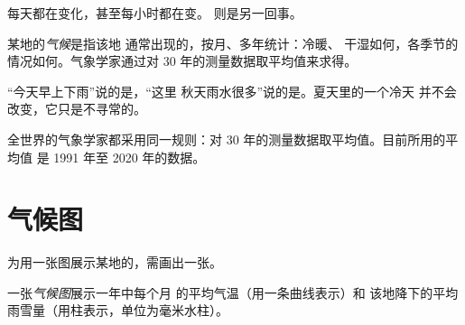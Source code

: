 每天都在变化，甚至每小时都在变。
则是另一回事。

\begin{definition}[气候]\label{def:g5:weather-and-climate:climate}
某地的\emph{气候}是指该地
通常出现的，按月、多年统计：冷暖、
干湿如何，各季节的情况如何。气象学家通过对
30 年的测量数据取平均值来求得。
\end{definition}

“今天早上下雨”说的是，“这里
秋天雨水很多”说的是。夏天里的一个冷天
并不会改变，它只是不寻常的。

全世界的气象学家都采用同一规则：对
30 年的测量数据取平均值。目前所用的平均值
是 1991 年至 2020 年的数据。

\section{气候图}

为用一张图展示某地的，需画出一张。

\begin{definition}[气候图]\label{def:g5:weather-and-climate:climate-chart}
一张\emph{气候图}展示一年中每个月
的平均气温（用一条曲线表示）和
该地降下的平均雨雪量（用柱表示，单位为毫米水柱）。
\end{definition}

